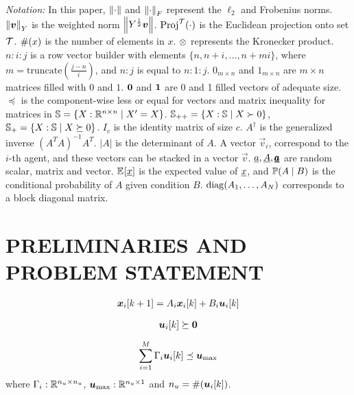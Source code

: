 \documentclass{ifacconf}  %
\begin{document}
\emph{Notation:} In this paper, $\left\lVert\cdot\right\rVert$ and $\left\lVert\cdot\right\rVert_{F}$ represent the $\ell_{2}$ and Frobenius norms. $\left\lVert\boldsymbol{v}\right\rVert_{Y}$ is the weighted norm $\left\lVert Y^{\frac{1}{2}}\boldsymbol{v}\right\rVert$.
$\operatorname{Proj}^{\mathcal{T}}(\cdot)$ is the Euclidean projection onto set $\mathcal{T}$.
$\#(x)$ is the number of elements in $x$.
$\otimes$ represents the Kronecker product.
$n\mathbin{:}i\mathbin{:}j$ is a row vector builder with elements $\{n,n+i,\dots,n+mi\}$, where $m=\mathrm{truncate}(\frac{j-n}{i})$, and ${n\mathbin{:}j}$ is equal to ${n\mathbin{:}1\mathbin{:}j}$.
$0_{m\times n}$ and $1_{m\times n}$ are ${m\times n}$ matrices filled with $0$ and $1$.
$\mathbf{0}$ and $\mathbf{1}$ are 0 and 1 filled vectors of adequate size.
$\preceq$ is the component-wise less or equal for vectors and matrix inequality for matrices in ${\mathbb{S}=\{X:\mathbb{R}^{n\times n}\mid X'=X\}}$.
${\mathbb{S}_{++}=\{X:\mathbb{S}\mid X\succ 0\}}$, ${\mathbb{S}_{+}=\{X:\mathbb{S}\mid X\succeq 0\}}$.
$I_{c}$ is the identity matrix of size $c$.
$A^{\dagger}$ is the generalized inverse ${{(A^{T}A)}^{-1}A^{T}}$.
$|A|$ is the determinant of $A$.
A vector $\vec{v}_{i}$, correspond to the $i$-th agent, and these vectors can be stacked in a vector $\vec{v}$.
$\underline{a},\underline{A},\pmb{\underline{a}}$ are random scalar, matrix and vector.
$\mathbb{E}_{}[\underline{x}]$ is the expected value of $\underline{x}$, and $\mathbb{P}(A \mid B)$ is the conditional probability of $A$ given condition $B$.
${\operatorname{diag}(A_{1},\dots,A_{N})}$ corresponds to a block diagonal matrix.

\section{PRELIMINARIES AND PROBLEM STATEMENT}\label{sec:PS}
\begin{equation}
\begin{matrix}
  \label{eq:systems}
\vec{x}_{i}[k+1]=A_{i}\xik + B_{i}\uik
\end{matrix}
\end{equation}

\begin{equation}
  \label{eq:upositive}
  \uik\succeq\0
\end{equation}

\begin{equation}
  \label{eq:constraint}
  \sum^{\nsubsystems}_{i=1}\Gamma_{i}\uik\preceq\umax
\end{equation}
where ${\Gamma_{i}:\mathbb{R}^{n_{u}\times n_{u}}}$, ${\boldsymbol{u}_{\mathrm{\max}}:\mathbb{R}^{n_{u}\times 1}}$ and ${n_{u}=\card{\uik}}$.
\end{document}
